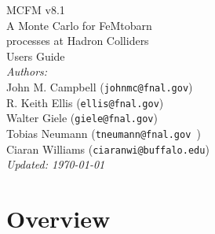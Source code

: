 \documentclass{article}
\begin{document}
\def\GeV{\mbox{GeV}}
\def\cteqten{\mbox{1007.2241 [hep-ph]}}
\def\cteqsixsixm{\mbox{0802.0007 [hep-ph]}}
\def\cteqsixonem{\mbox{hep-ph/0303013}}
\def\cteqsix{\mbox{hep-ph/0201195}}
\def\cteqfive{\mbox{hep-ph/9903282}}
\def\cteqfour{\mbox{hep-ph/9606399}}
\def\cteqthree{\mbox{MSU-HEP/41024}}
\def\mrstff{\mbox{hep-ph/0603143}}
\def\mrstohtwo{\mbox{hep-ph/0211080}}
\def\mrstohtwofirst{\mbox{hep-ph/0201127}}
\def\mrstohone{\mbox{hep-ph/0110215}}
\def\mrsninenine{\mbox{hep-ph/9907231}}
\def\mrsnineeight{\mbox{hep-ph/9803445}}
\def\mrsninesix{\mbox{PLB387 (1996) 419}}
\def\mrsninefive{\mbox{PLB354 (1995) 155}}
\def\hmrs{\mbox{Durham DTP-90-04}}
\def\mstwoheight{\mbox{0901.0002 [hep-ph]}}
\def\MCFM{{\tt MCFM }}
\def\pow{{\lower.12ex\hbox{\texttt{\char`\^}}}}


\thispagestyle{empty}
\vspace*{3cm}
\begin{center}
{\Huge MCFM v8.1} \\
\vspace*{0.5cm}
\Large{A Monte Carlo for FeMtobarn} \\
\Large{processes at Hadron Colliders} \\
\vspace*{1.5cm}
{\huge Users Guide} \\
\vspace*{4cm}
{\it Authors:} \\
\vspace*{0.2cm}
John M. Campbell ({\tt johnmc@fnal.gov}) \\
R. Keith Ellis ({\tt ellis@fnal.gov}) \\
Walter Giele ({\tt giele@fnal.gov}) \\
Tobias Neumann ({\tt tneumann@fnal.gov }) \\
Ciaran Williams ({\tt ciaranwi@buffalo.edu}) \\
\vspace*{1.5cm}
{\it \small Updated: \today}
\end{center}

\newpage

\tableofcontents

\newpage

\section{Overview}
\end{document}
